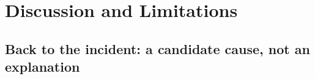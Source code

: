 \section{Discussion and Limitations}\label{sec:discussion}
\subsection{Back to the incident: a candidate cause, not an explanation}

